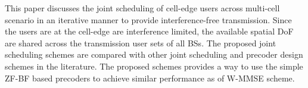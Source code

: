 This paper discusses the joint scheduling of cell-edge users across multi-cell scenario in an iterative manner to provide interference-free transmission. Since the users are at the cell-edge are interference limited, the available spatial \ac{DoF} are shared across the transmission user sets of all \ac{BS}s. The proposed joint scheduling schemes are compared with other joint scheduling and precoder design schemes in the literature. The proposed schemes provides a way to use the simple \ac{ZF}-\ac{BF} based precoders to achieve similar performance as of \ac{W-MMSE} scheme.
